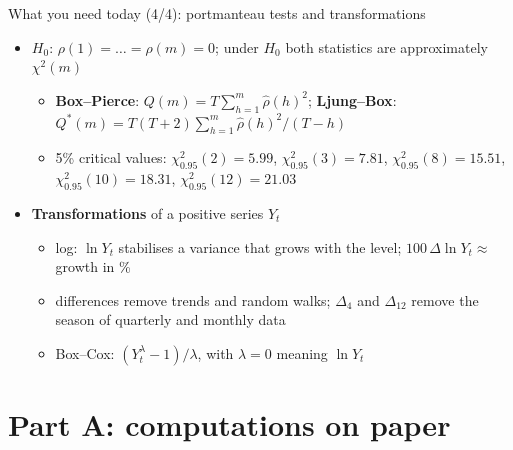 \begin{frame}{What you need today (4/4): portmanteau tests and transformations}
\itemsize{\small}
\begin{itemize}
    \item $H_0$: $\rho(1) = \dots = \rho(m) = 0$; under $H_0$ both statistics are approximately $\chi^2(m)$
    \begin{itemize}
        \item \textbf{Box--Pierce}: $Q(m) = T\sum_{h=1}^{m}\hat\rho(h)^2$; \textbf{Ljung--Box}: $Q^*(m) = T(T + 2)\sum_{h=1}^{m}\hat\rho(h)^2/(T - h)$
        \item 5\% critical values: $\chi^2_{0.95}(2) = 5.99$, $\chi^2_{0.95}(3) = 7.81$, $\chi^2_{0.95}(8) = 15.51$, $\chi^2_{0.95}(10) = 18.31$, $\chi^2_{0.95}(12) = 21.03$
    \end{itemize}
    \item \textbf{Transformations} of a positive series $Y_t$
    \begin{itemize}
        \item log: $\ln Y_t$ stabilises a variance that grows with the level; $100\,\Delta\ln Y_t \approx$ growth in \%
        \item differences remove trends and random walks; $\Delta_4$ and $\Delta_{12}$ remove the season of quarterly and monthly data
        \item Box--Cox: $(Y_t^\lambda - 1)/\lambda$, with $\lambda = 0$ meaning $\ln Y_t$
    \end{itemize}
\end{itemize}
\end{frame}


\section{Part A: computations on paper}

